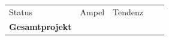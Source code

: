 \begin{landscape}
\begin{table}[]
{\begin{tabular}{lllllll}
{\color[HTML]{FFFFFF} Status}                                               & {\color[HTML]{FFFFFF} Ampel}                                                                                                                                                                                                                                   & {\color[HTML]{FFFFFF} Tendenz}                                                                                                                                                                                                                                 & {\color[HTML]{FFFFFF} } & \multicolumn{3}{l}{\cellcolor[HTML]{A6A6A6}{\color[HTML]{FFFFFF} Begründung}}                                                                                                                                                                                                                                                                                                                                                                               \\
\textbf{Gesamtprojekt}                                                      &                                                                                                                                                                                                                                                                &                                                                                                                                                                                                                                                                &                         & \multicolumn{3}{l}{}                                                                                                                                                                                                                                                                                                                                                                                                                                        \\ \hline

\end{tabular}}
\end{table}
\end{landscape}

